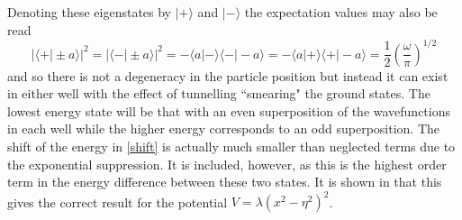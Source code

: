 Denoting these eigenstates by $\vert + \rangle$ and $\vert - \rangle$ the expectation values may also be read
\begin{equation}
{\vert \langle + \vert \pm a \rangle \vert}^2 = {\vert \langle - \vert \pm a \rangle \vert}^2 = - \langle a \vert - \rangle \langle - \vert -a \rangle = -\langle a \vert + \rangle \langle + \vert -a \rangle =\frac{1}{2}\left(\frac{\omega}{\pi}\right)^{1/2}
\end{equation}
and so there is not a degeneracy in the particle position but instead it can exist in either well with the effect of tunnelling ``smearing" the ground states. The lowest energy state will be that with an even superposition of the wavefunctions in each well while the higher energy corresponds to an odd superposition.  The shift of the energy in \ref{shift} is actually much smaller than neglected terms due to the exponential suppression. It is included, however, as this is the highest order term in the energy difference between these two states. It is shown in \citep{instln} that this gives the correct result for the potential $V = \lambda(x^2-\eta^2)^2$. 